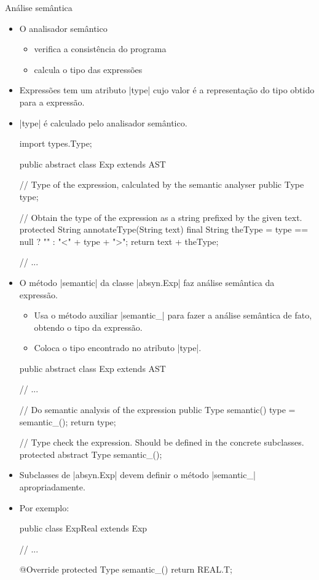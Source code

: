 \documentclass[smaller]{beamer}
\begin{document}
\begin{frame}{Análise semântica}
  \begin{itemize}
    \item O analisador semântico
    \begin{itemize}
      \item verifica a consistência do programa
      \item calcula o tipo das expressões
    \end{itemize}
    \item Expressões tem um atributo \pyginline|type| cujo valor é a
    representação do tipo obtido para a expressão.
    \item \pyginline|type| é calculado pelo analisador semântico.
\begin{pygmented}[]
import types.Type;

public abstract class Exp extends AST {

   // Type of the expression, calculated by the semantic analyser
   public Type type;

   // Obtain the type of the expression as a string prefixed by the given text.
   protected String annotateType(String text) {
      final String theType = type == null ? "" : "\n<" + type + ">";
      return text + theType;
   }

   // ...
}
\end{pygmented}

    \framebreak
    
    \item O método \pyginline|semantic| da classe
    \pyginline|absyn.Exp| faz análise semântica da expressão.
    \begin{itemize}
      \item Usa o método auxiliar \pyginline|semantic_| para fazer a
      análise semântica de fato, obtendo o tipo da expressão.
      \item Coloca o tipo encontrado no atributo \pyginline|type|.
    \end{itemize}
\begin{pygmented}[]
public abstract class Exp extends AST {
   // ...

   // Do semantic analysis of the expression
   public Type semantic() {
      type = semantic_();
      return type;
   }

   // Type check the expression. Should be defined in the concrete subclasses.
   protected abstract Type semantic_();
}
\end{pygmented}
    
    \item Subclasses de \pyginline|absyn.Exp| devem definir o método
    \pyginline|semantic_| apropriadamente.
    
    \item Por exemplo:
\begin{pygmented}[]
public class ExpReal extends Exp {
   // ...

   @Override
   protected Type semantic_() {
      return REAL.T;
   }
}
\end{pygmented}

  \end{itemize}
\end{frame}
\end{document}
